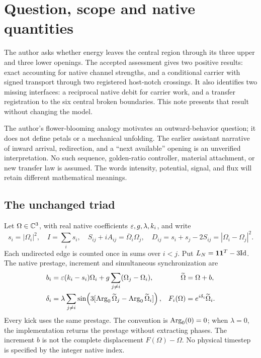 \section{Question, scope and native quantities}
The author asks whether energy leaves the central region through its three upper and three lower openings. The accepted assessment \cite{assessment} gives two positive results: exact accounting for native channel strengths, and a conditional carrier with signed transport through two registered host-notch crossings. It also identifies two missing interfaces: a reciprocal native debit for carrier work, and a transfer registration to the six central broken boundaries. This note presents that result without changing the model.

The author's flower-blooming analogy motivates an outward-behavior question; it does not define petals or a mechanical unfolding. The earlier assistant narrative of inward arrival, redirection, and a ``next available'' opening is an unverified interpretation. No such sequence, golden-ratio controller, material attachment, or new transfer law is assumed. The words intensity, potential, signal, and flux will retain different mathematical meanings.

\subsection{The unchanged triad}
Let $\Omega\in\mathbb C^3$, with real native coefficients $\varepsilon,g,\lambda,k_i$, and write
\begin{equation}\label{eq:quantities}
 s_i=|\Omega_i|^2,\quad I=\sum_i s_i,\quad
 S_{ij}+iA_{ij}=\overline\Omega_i\Omega_j,\quad
 D_{ij}=s_i+s_j-2S_{ij}=|\Omega_i-\Omega_j|^2.
\end{equation}
Each undirected edge is counted once in sums over $i<j$. Put $L_N=\mathbf1\mathbf1^T-3\mathrm{Id}$. The native prestage, increment and simultaneous synchronization are \cite{nrg,potential}
\begin{align}
 b_i&=\varepsilon(k_i-s_i)\Omega_i+g\sum_{j\ne i}(\Omega_j-\Omega_i),
 &\widetilde\Omega&=\Omega+b,\label{eq:pre}\\
 \delta_i&=\lambda\sum_{j\ne i}\sin\!\left(3[\operatorname{Arg}_0\widetilde\Omega_j-\operatorname{Arg}_0\widetilde\Omega_i]\right),
 &F_i(\Omega)&=e^{i\delta_i}\widetilde\Omega_i.\label{eq:map}
\end{align}
Every kick uses the same prestage. The convention is $\operatorname{Arg}_0(0)=0$; when $\lambda=0$, the implementation returns the prestage without extracting phases. The increment $b$ is not the complete displacement $F(\Omega)-\Omega$. No physical timestep is specified by the integer native index.

